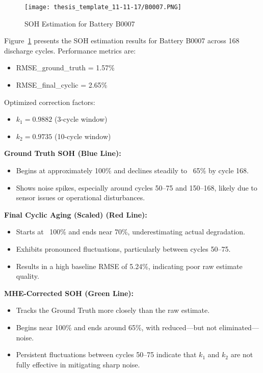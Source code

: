 \begin{figure}
    \centering
    \texttt{[image: thesis\_template\_11-11-17/B0007.PNG]}
    \caption{SOH Estimation for Battery B0007}
    \label{fig:resB0007}
\end{figure}

Figure~\ref{fig:resB0007} presents the SOH estimation results for Battery B0007 across 168 discharge cycles. Performance metrics are:
\begin{itemize}
    \item RMSE\_ground\_truth = 1.57\%
    \item RMSE\_final\_cyclic = 2.65\%
\end{itemize}

Optimized correction factors:
\begin{itemize}
    \item $k_1 = 0.9882$ (3-cycle window)
    \item $k_2 = 0.9735$ (10-cycle window)
\end{itemize}

\vspace{0.5em}
\textbf{Ground Truth SOH (Blue Line):}
\begin{itemize}
    \item Begins at approximately 100\% and declines steadily to ~65\% by cycle 168.
    \item Shows noise spikes, especially around cycles 50--75 and 150--168, likely due to sensor issues or operational disturbances.
\end{itemize}

\vspace{0.5em}
\textbf{Final Cyclic Aging (Scaled) (Red Line):}
\begin{itemize}
    \item Starts at ~100\% and ends near 70\%, underestimating actual degradation.
    \item Exhibits pronounced fluctuations, particularly between cycles 50--75.
    \item Results in a high baseline RMSE of 5.24\%, indicating poor raw estimate quality.
\end{itemize}

\vspace{0.5em}
\textbf{MHE-Corrected SOH (Green Line):}
\begin{itemize}
    \item Tracks the Ground Truth more closely than the raw estimate.
    \item Begins near 100\% and ends around 65\%, with reduced—but not eliminated—noise.
    \item Persistent fluctuations between cycles 50--75 indicate that $k_1$ and $k_2$ are not fully effective in mitigating sharp noise.
\end{itemize}

